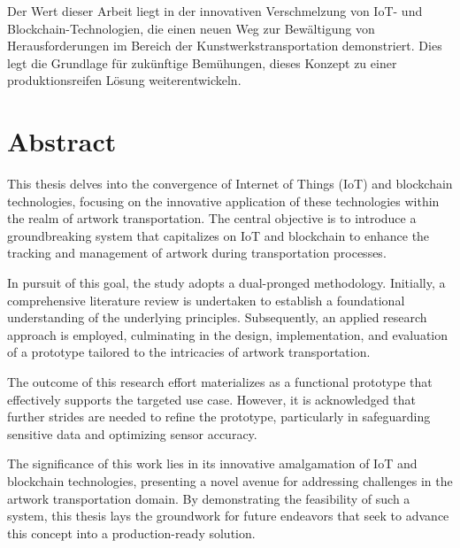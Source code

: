 Der Wert dieser Arbeit liegt in der innovativen Verschmelzung von IoT- und Blockchain-Technologien, die einen neuen Weg zur Bewältigung von Herausforderungen im Bereich der Kunstwerkstransportation demonstriert. Dies legt die Grundlage für zukünftige Bemühungen, dieses Konzept zu einer produktionsreifen Lösung weiterentwickeln.


\chapter*{Abstract}
This thesis delves into the convergence of Internet of Things (IoT) and blockchain technologies, focusing on the innovative application of these technologies within the realm of artwork transportation. The central objective is to introduce a groundbreaking system that capitalizes on IoT and blockchain to enhance the tracking and management of artwork during transportation processes.

In pursuit of this goal, the study adopts a dual-pronged methodology. Initially, a comprehensive literature review is undertaken to establish a foundational understanding of the underlying principles. Subsequently, an applied research approach is employed, culminating in the design, implementation, and evaluation of a prototype tailored to the intricacies of artwork transportation.

The outcome of this research effort materializes as a functional prototype that effectively supports the targeted use case. However, it is acknowledged that further strides are needed to refine the prototype, particularly in safeguarding sensitive data and optimizing sensor accuracy.

The significance of this work lies in its innovative amalgamation of IoT and blockchain technologies, presenting a novel avenue for addressing challenges in the artwork transportation domain. By demonstrating the feasibility of such a system, this thesis lays the groundwork for future endeavors that seek to advance this concept into a production-ready solution.
